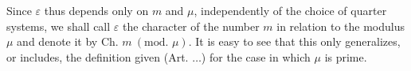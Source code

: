 Since $\varepsilon$ thus depends only on $m$ and $\mu$, independently of the choice of quarter systems, we shall call $\varepsilon$ the character of the number $m$ in relation to the modulus $\mu$ and denote it by $\text{Ch. }m\ (\text{mod. }\mu)$. It is easy to see that this only generalizes, or includes, the definition given (Art. $\ldots$) for the case in which $\mu$ is prime.
